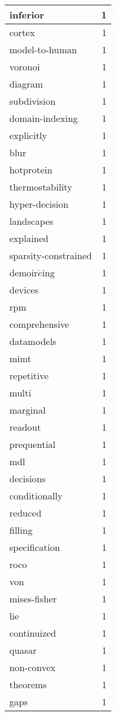 \begin{table}[h]
\begin{tabular}{|l|r|}
\hline
inferior & 1 \\
\hline
cortex & 1 \\
\hline
model-to-human & 1 \\
\hline
voronoi & 1 \\
\hline
diagram & 1 \\
\hline
subdivision & 1 \\
\hline
domain-indexing & 1 \\
\hline
explicitly & 1 \\
\hline
blur & 1 \\
\hline
hotprotein & 1 \\
\hline
thermostability & 1 \\
\hline
hyper-decision & 1 \\
\hline
landscapes & 1 \\
\hline
explained & 1 \\
\hline
sparsity-constrained & 1 \\
\hline
demoir$\acute{e}$ing & 1 \\
\hline
devices & 1 \\
\hline
rpm & 1 \\
\hline
comprehensive & 1 \\
\hline
datamodels & 1 \\
\hline
mimt & 1 \\
\hline
repetitive & 1 \\
\hline
multi & 1 \\
\hline
marginal & 1 \\
\hline
readout & 1 \\
\hline
prequential & 1 \\
\hline
mdl & 1 \\
\hline
decisions & 1 \\
\hline
conditionally & 1 \\
\hline
reduced & 1 \\
\hline
filling & 1 \\
\hline
specification & 1 \\
\hline
roco & 1 \\
\hline
von & 1 \\
\hline
mises-fisher & 1 \\
\hline
lie & 1 \\
\hline
continuized & 1 \\
\hline
quasar & 1 \\
\hline
non-convex & 1 \\
\hline
theorems & 1 \\
\hline
gaps & 1 \\

\end{tabular}
\end{table}
